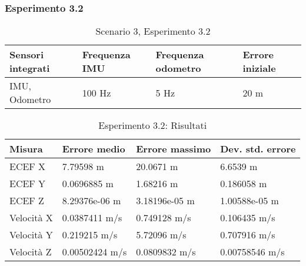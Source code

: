 \subsubsection{Esperimento 3.2}
\begin{table}[h]
	\centering
	\begin{tabular}{|p{3.2cm}|p{2.75cm}|p{2.75cm}|p{2.75cm}|}
		\hline 
		\textbf{Sensori integrati} & \textbf{Frequenza IMU}  & \textbf{Frequenza odometro} & \textbf{Errore iniziale} \\ 
		\hline 
		IMU, Odometro & 100 Hz & 5 Hz & 20 m \\ 
		\hline 
	\end{tabular}
	\caption{Scenario 3, Esperimento 3.2}
\end{table}
\begin{table}[h]
	\centering
	\begin{tabular}{|p{2cm}|p{3.2cm}|p{3cm}|p{3cm}|}
		\hline 
		\textbf{Misura} 
		& \textbf{Errore medio} 
		& \textbf{Errore massimo}
		& \textbf{Dev. std. errore}\\ 
		\hline 
		ECEF X & 7.79598 m & 20.0671 m & 6.6539 m \\ 
		\hline 
		ECEF Y & 0.0696885 m & 1.68216 m & 0.186058 m \\ 
		\hline 
		ECEF Z & 8.29376e-06 m & 3.18196e-05 m & 1.00588e-05 m \\ 
		\hline 
		Velocit\`a X & 0.0387411 m/s & 0.749128 m/s & 0.106435 m/s \\ 
		\hline 
		Velocit\`a Y & 0.219215 m/s & 5.72096 m/s & 0.707916 m/s \\ 
		\hline 
		Velocit\`a Z & 0.00502424 m/s & 0.0809832 m/s & 0.00758546 m/s \\ 
		\hline 
	\end{tabular} 
	\caption{Esperimento 3.2: Risultati}
\end{table}
